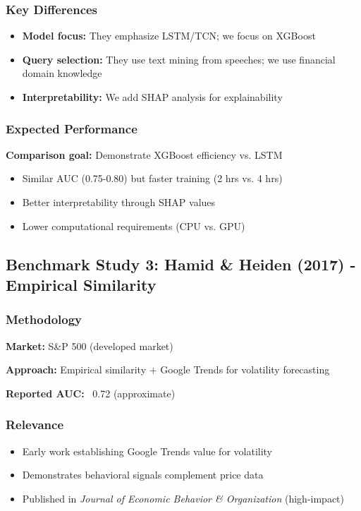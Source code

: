\documentclass[12pt,a4paper]{article}
\begin{document}
\subsubsection{Key Differences}

\begin{itemize}
    \item \textbf{Model focus:} They emphasize LSTM/TCN; we focus on XGBoost
    \item \textbf{Query selection:} They use text mining from speeches; we use financial domain knowledge
    \item \textbf{Interpretability:} We add SHAP analysis for explainability
\end{itemize}

\subsubsection{Expected Performance}

\textbf{Comparison goal:} Demonstrate XGBoost efficiency vs. LSTM
\begin{itemize}
    \item Similar AUC (0.75-0.80) but faster training (2 hrs vs. 4 hrs)
    \item Better interpretability through SHAP values
    \item Lower computational requirements (CPU vs. GPU)
\end{itemize}

\subsection{Benchmark Study 3: Hamid \& Heiden (2017) - Empirical Similarity}

\subsubsection{Methodology}

\textbf{Market:} S\&P 500 (developed market)

\textbf{Approach:} Empirical similarity + Google Trends for volatility forecasting

\textbf{Reported AUC:} ~0.72 (approximate)

\subsubsection{Relevance}

\begin{itemize}
    \item Early work establishing Google Trends value for volatility
    \item Demonstrates behavioral signals complement price data
    \item Published in \textit{Journal of Economic Behavior \& Organization} (high-impact)
\end{itemize}
\end{document}
